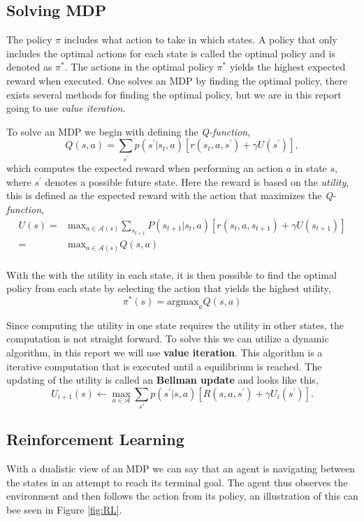 \documentclass[12pt,A4]{report}
\theoremstyle{definition}
\begin{document}
\subsection{Solving MDP}
The policy $\pi$ includes what action to take in which states. A policy that only includes the optimal actions for each state is called the optimal policy and is denoted as $\pi^*$. The actions in the optimal policy $\pi^*$ yields the highest expected reward when executed. One solves an MDP by finding the optimal policy, there exists several methods for finding the optimal policy, but we are in this report going to use \textit{value iteration}. 

To solve an MDP we begin with defining the \textit{Q-function},
\[ Q(s, a) = \sum_{s^\prime}p(s^\prime|s_t,a)[r(s_t,a,s^\prime) + \gamma U(s^\prime)],\]
which computes the expected reward when performing an action $a$ in state $s$, where $s^\prime$ denotes a possible future state. Here the reward is based on the \textit{utility}, this is defined as the expected reward with the action that maximizes the \textit{Q-function},
\begin{align*}
  U(s) =& \text{max}_{a\in \mathcal{A}(s)} \sum_{s_{t+1}}P(s_{t+1}|s_t,a)[r(s_t,a,s_{t+1}) + \gamma U(s_{t+1})]\\
  = &  \text{max}_{a\in \mathcal{A}(s)} Q(s,a)\\
\end{align*}

With the with the utility in each state, it is then possible to find the optimal policy from each state by selecting the action that yields the highest utility,
\[ \pi^*(s) = \text{argmax}_a Q(s,a) \]

Since computing the utility in one state requires the utility in other states, the computation is not straight forward. To solve this we can utilize a dynamic algorithm, in this report we will use \textbf{value iteration}. This algorithm is a iterative computation that is executed until a equilibrium is reached. The updating of the utility is called an \textbf{Bellman update} and looks like this,
\[U_{i+1}(s) \leftarrow \max_{a\in\mathcal{A}} \sum_{s\prime} p(s^\prime|s,a)[R(s,a,s^\prime) + \gamma U_i(s^\prime)].\]

\subsection{Reinforcement Learning}
With a dualistic view of an MDP we can say that an agent is navigating between the states in an attempt to reach its terminal goal. The agent thus observes the environment and then follows the action from its policy, an illustration of this can bee seen in Figure \ref{fig:RL}. 
\end{document}
